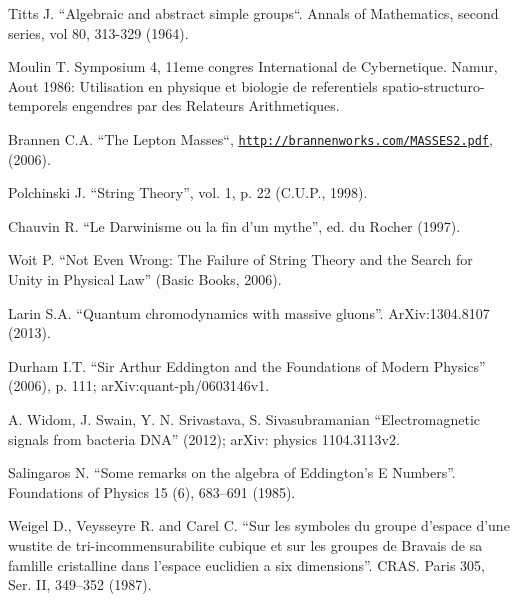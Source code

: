 \documentclass[twoside,draft]{article}
\begin{document}
\begin{sloppypar}
\begin{thebibliography}{99}
 Titts J. ``Algebraic and abstract simple groups``. Annals of Mathematics, second series, vol 80, 313-329 (1964).



 Moulin T. Symposium 4, 11eme congres International de Cybernetique. Namur, Aout 1986: Utilisation en physique et biologie de referentiels spatio-structuro-temporels engendres par des Relateurs Arithmetiques. 

 Brannen C.A. ``The Lepton Masses``, \href{http://brannenworks.com/MASSES2.pdf}{\texttt{http://brannenworks.com/MASSES2.pdf}}, (2006).

 Polchinski J. ``String Theory'', vol. 1, p. 22 (C.U.P., 1998).

 Chauvin R. ``Le Darwinisme ou la fin d'un mythe'', ed. du Rocher
(1997).

 Woit P. ``Not Even Wrong: The Failure of String Theory and the
Search for Unity in Physical Law'' (Basic Books, 2006).

 Larin S.A. ``Quantum chromodynamics with massive gluons''.
ArXiv:1304.8107 (2013).

 Durham I.T. ``Sir Arthur Eddington and the Foundations of Modern
Physics'' (2006), p. 111; arXiv:quant-ph/0603146v1.

 A. Widom, J. Swain, Y. N. Srivastava, S. Sivasubramanian ``Electromagnetic signals from bacteria DNA''
(2012); arXiv: physics 1104.3113v2.

 Salingaros N. ``Some remarks on the algebra of Eddington's E
Numbers''. Foundations of Physics 15 (6), 683--691 (1985).

 Weigel D., Veysseyre R. and Carel C. ``Sur les symboles du groupe
d'espace d'une wustite de tri-incommensurabilite cubique et sur les groupes de
Bravais de sa famlille cristalline dans l'espace euclidien a six dimensions''.
CRAS. Paris 305, Ser. II, 349--352 (1987).


\end{thebibliography}
\end{sloppypar}
\end{document}
